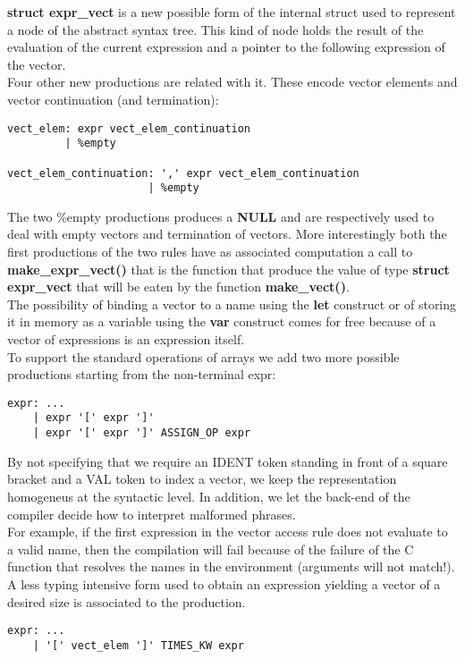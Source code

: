 \documentclass[11pt]{article}
\begin{document}
\textbf{struct expr\_vect} is a new possible form of the internal struct used to represent a node of the abstract syntax tree. This kind of node holds the result of the evaluation of the current expression and a pointer to the following expression of the vector.\\

Four other new productions are related with it. These encode vector elements and vector continuation (and termination):
\begin{verbatim}     
vect_elem: expr vect_elem_continuation 
         | %empty   

vect_elem_continuation: ',' expr vect_elem_continuation
                      | %empty        
\end{verbatim}{}

The two \%empty productions produces a \textbf{NULL} and are respectively used to deal with empty vectors and termination of vectors. More interestingly both the first productions of the two rules have as associated computation a call to \textbf{make\_expr\_vect()} that is the function that produce the value of type \textbf{struct expr\_vect} that will be eaten by the function \textbf{make\_vect()}.\\

The possibility of binding a vector to a name using the \textbf{let} construct or of storing it in memory as a variable using the \textbf{var} construct comes for free because of a vector of expressions is an expression itself.
\\
\medskip
To support the standard operations of arrays we add two more possible productions starting from the non-terminal expr:
\begin{verbatim}
expr: ...
    | expr '[' expr ']'                
    | expr '[' expr ']' ASSIGN_OP expr
\end{verbatim}{}
By not specifying that we require an IDENT token standing in front of a square bracket and a VAL token to index a vector, we keep the representation homogeneus at the syntactic level. In addition, we let the back-end of the compiler decide how to interpret malformed phrases. \\
For example, if the first expression in the vector access rule does not evaluate to a valid name, then the compilation will fail because of the failure of the C function that resolves the names in the environment (arguments will not match!). \\
A less typing intensive form used to obtain an expression yielding a vector of a desired size is associated to the production.
\begin{verbatim}
expr: ...
    | '[' vect_elem ']' TIMES_KW expr
\end{verbatim}{}
\end{document}
